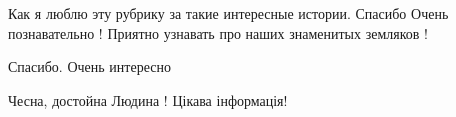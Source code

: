  
 
 
 
 

Как я люблю эту рубрику за такие интересные истории.
Спасибо
Очень познавательно !
Приятно узнавать про наших знаменитых земляков !

Спасибо. Очень интересно

Чесна, достойна Людина ! Цікава інформація!

\zzrule

